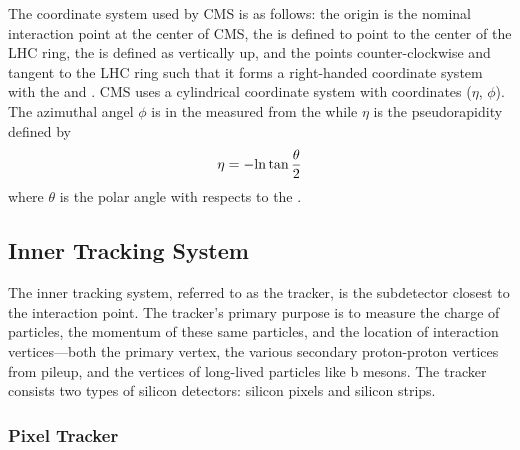 The coordinate system used by CMS is as follows: the origin is the nominal
interaction point at the center of CMS, the \xaxis is defined to point to the
center of the LHC ring, the \yaxis is defined as vertically up, and the \zaxis
points counter-clockwise and tangent to the LHC ring such that it forms a
right-handed coordinate system with the \xaxis and \yaxis. CMS uses a
cylindrical coordinate system with coordinates ($\eta$, $\phi$). The azimuthal
angel $\phi$ is in the \xyplane measured from the \xaxis while $\eta$ is the
pseudorapidity defined by
\begin{equation}
    \eta = -{\mathrm{ln}} \tan \frac{\theta}{2}
\end{equation}
where $\theta$ is the polar angle with respects to the \zaxis.

\subsection{Inner Tracking System}


The inner tracking system, referred to as the tracker, is the subdetector
closest to the interaction point. The tracker's primary purpose is to measure
the charge of particles, the momentum of these same particles, and the location
of interaction vertices---both the primary vertex, the various secondary
proton-proton vertices from pileup, and the vertices of long-lived particles
like b mesons. The tracker consists two types of silicon detectors: silicon
pixels and silicon strips.

\subsubsection{Pixel Tracker}

